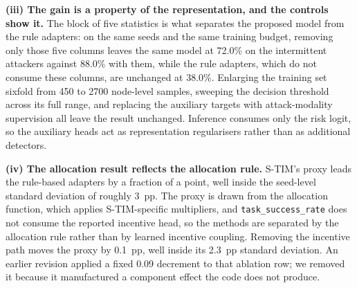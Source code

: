 \documentclass[notspecified,article,submit,moreauthors]{Definitions/mdpi}
\begin{document}
\begin{table}[!htbp]
  \centering
  \caption{On--off detection rate (\%) against duty cycle, 30 UAVs, 30\% malicious, 50 evaluation seeds. Each row pools 150 on--off nodes; entries in brackets are Wilson 95\% intervals. Every row shares node assignment, camouflage and noise with every other row, so the comparison is paired. The evaluated checkpoints were trained at a duty of 0.50.}
  \label{tab:duty_sweep}
  \footnotesize
  \setlength{\tabcolsep}{5pt}
  \renewcommand{\arraystretch}{1.15}
\end{table}

\textbf{(iii) The gain is a property of the representation, and the controls show it.} The block of five statistics is what separates the proposed model from the rule adapters: on the same seeds and the same training budget, removing only those five columns leaves the same model at 72.0\% on the intermittent attackers against 88.0\% with them, while the rule adapters, which do not consume these columns, are unchanged at 38.0\%. Enlarging the training set sixfold from 450 to 2700 node-level samples, sweeping the decision threshold across its full range, and replacing the auxiliary targets with attack-modality supervision all leave the result unchanged. Inference consumes only the risk logit, so the auxiliary heads act as representation regularisers rather than as additional detectors.

\textbf{(iv) The allocation result reflects the allocation rule.} S-TIM's proxy leads the rule-based adapters by a fraction of a point, well inside the seed-level standard deviation of roughly 3~pp. The proxy is drawn from the allocation function, which applies S-TIM-specific multipliers, and \texttt{task\_success\_rate} does not consume the reported incentive head, so the methods are separated by the allocation rule rather than by learned incentive coupling. Removing the incentive path moves the proxy by 0.1~pp, well inside its 2.3~pp standard deviation. An earlier revision applied a fixed 0.09 decrement to that ablation row; we removed it because it manufactured a component effect the code does not produce.
\end{document}
